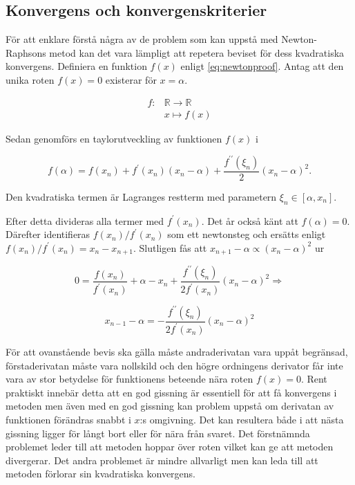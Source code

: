 \subsection{Konvergens och konvergenskriterier}

För att enklare förstå några av de problem som kan uppstå med Newton-Raphsons metod kan det vara lämpligt
att repetera beviset för dess kvadratiska konvergens. Definiera en funktion $f(x)$ enligt \eqref{eq:newtonproof}.
Antag att den unika roten $f(x) = 0$ existerar för $x = \alpha$.

\begin{align}
f: & \mathbb{R} \to \mathbb{R} \nonumber \\
   & x \mapsto f(x) \label{eq:newtonproof}
\end{align}

\noindent
Sedan genomförs en taylorutveckling av funktionen $f(x)$ i 

\begin{equation}
\label{eq:newtonprooftaylor}
f(\alpha) = f(x_n) + f^\prime(x_n)(x_n-\alpha) + \frac{f^{\prime\prime}(\xi_n)}{2}(x_n-\alpha)^2.
\end{equation}

Den kvadratiska termen är Lagranges restterm med parametern $\xi_n \in [\alpha, x_n]$.

Efter detta divideras alla termer med $f^\prime(x_n)$. Det år också känt att $f(\alpha)=0$.
Därefter identifieras  $f(x_n)/f^\prime(x_n)$ som ett newtonsteg och ersätts enligt
$f(x_n)/f^\prime(x_n) = x_n-x_{n+1}$. Slutligen fås att $x_{n+1}-\alpha \propto (x_{n}-\alpha)^2$ ur

\begin{equation}
0 = \frac{f(x_n)}{f^\prime(x_n)} + \alpha - x_n + \frac{f^{\prime\prime}(\xi_n)}{2f^\prime(x_n)}(x_n-\alpha)^2
\Rightarrow
\end{equation}

\begin{equation}
\label{eq:newtonqed}
x_{n-1} - \alpha = - \frac{f^{\prime\prime}(\xi_n)}{2f^\prime(x_n)}(x_n-\alpha)^2 
\end{equation}

För att ovanstående bevis ska gälla måste andraderivatan vara uppåt begränsad, förstaderivatan måste vara nollskild och den högre ordningens derivator får inte vara av stor betydelse för funktionens beteende nära roten $f(x) = 0$. Rent praktiskt innebär detta att en god gissning är essentiell för att få
konvergens i metoden men även med en god gissning kan problem uppstå om derivatan av funktionen
förändras snabbt i $x$:s omgivning. Det kan resultera både i att nästa gissning ligger för långt
bort eller för nära från svaret. Det förstnämnda problemet leder till att metoden hoppar över roten vilket kan ge att metoden divergerar. Det andra problemet är mindre allvarligt men kan leda till att metoden förlorar sin kvadratiska konvergens.

